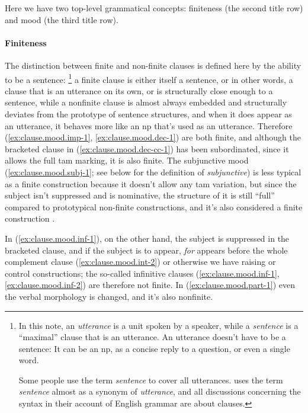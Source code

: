\documentclass[UTF8, a4paper, oneside, scheme=plain, 12pt]{ctexbook}
\newcommand*{\citepage}[1]{p.~{#1}}
\newcommand*{\term}[1]{\emph{#1}}
\newcommand{\form}[1]{\emph{#1}}
\begin{document}
Here we have two top-level grammatical concepts: 
finiteness (the second title row) and mood (the third title row). 

\paragraph*{Finiteness} The distinction between finite and non-finite clauses 
is defined here by the ability to be a sentence:%
\footnote{
    In this note, an \term{utterance} is a unit spoken by a speaker,
    while a \term{sentence} is a ``maximal'' clause that is an utterance.
    An utterance doesn't have to be a sentence:
    It can be an \acs{np}, as a concise reply to a question,
    or even a single word.

    Some people use the term \term{sentence} to cover all utterances.
    \citet[\citepage{45}, \citepage{853}]{cgel} uses the term \term{sentence} 
    almost as a synonym of \term{utterance},
    and all discussions concerning the syntax in their account of English grammar are about clauses.
} 
a finite clause is either itself a sentence,
or in other words, a clause that is an utterance on its own,
or is structurally close enough to a sentence,
while a nonfinite clause is almost always embedded and structurally deviates 
from the prototype of sentence structures,
and when it does appear as an utterance,
it behaves more like an \acs{np} that's used as an utterance.
Therefore (\ref{ex:clause.mood.imp-1}, \ref{ex:clause.mood.dec-1}) are both finite, 
and although the bracketed clause in (\ref{ex:clause.mood.dec-cc-1}) has been subordinated, 
since it allows the full \acs{tam} marking, it is also finite.
The subjunctive mood (\ref{ex:clause.mood.subj-1}; see below for the definition of \term{subjunctive}) 
is less typical as a finite construction 
because it doesn't allow any \acs{tam} variation, 
but since the subject isn't suppressed and is nominative, 
the structure of it is still ``full'' compared to prototypical non-finite constructions, 
and it's also considered a finite construction \citep[\citepage{83}]{cgel}.

In (\ref{ex:clause.mood.inf-1}), on the other hand, 
the subject is suppressed in the bracketed clause, 
and if the subject is to appear, 
\form{for} appears before the whole complement clause (\ref{ex:clause.mood.int-2})
or otherwise we have raising or control constructions;
the so-called infinitive clauses (\ref{ex:clause.mood.inf-1},\ref{ex:clause.mood.inf-2}) 
are therefore not finite.
In (\ref{ex:clause.mood.part-1}) even the verbal morphology is changed, 
and it's also nonfinite.
\end{document}
